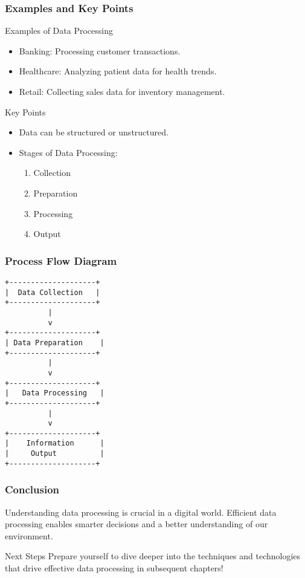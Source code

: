 \documentclass[aspectratio=169]{beamer}
\begin{document}
\begin{frame}[fragile]
    \frametitle{Examples and Key Points}
    \begin{block}{Examples of Data Processing}
        \begin{itemize}
            \item Banking: Processing customer transactions.
            \item Healthcare: Analyzing patient data for health trends.
            \item Retail: Collecting sales data for inventory management.
        \end{itemize}
    \end{block}
    
    \begin{block}{Key Points}
        \begin{itemize}
            \item Data can be structured or unstructured.
            \item Stages of Data Processing:
            \begin{enumerate}
                \item Collection
                \item Preparation
                \item Processing
                \item Output
            \end{enumerate}
        \end{itemize}
    \end{block}
\end{frame}

\begin{frame}[fragile]
    \frametitle{Process Flow Diagram}
    \begin{center}
        \begin{verbatim}
+--------------------+
|  Data Collection   |
+--------------------+
          |
          v
+--------------------+
| Data Preparation    |
+--------------------+
          |
          v
+--------------------+
|   Data Processing   |
+--------------------+
          |
          v
+--------------------+
|    Information      |
|     Output          |
+--------------------+
        \end{verbatim}
    \end{center}
\end{frame}

\begin{frame}[fragile]
    \frametitle{Conclusion}
    Understanding data processing is crucial in a digital world. Efficient data processing enables smarter decisions and a better understanding of our environment. 
    \begin{block}{Next Steps}
        Prepare yourself to dive deeper into the techniques and technologies that drive effective data processing in subsequent chapters!
    \end{block}
\end{frame}
\end{document}
